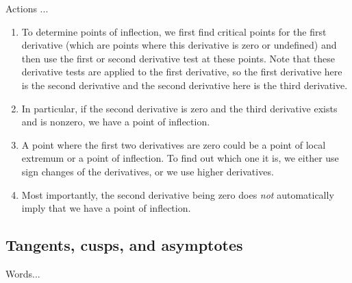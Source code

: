 \documentclass[10pt]{amsart}
\begin{document}
Actions ...

\begin{enumerate}

\item To determine points of inflection, we first find critical points
  for the first derivative (which are points where this derivative is
  zero or undefined) and then use the first or second derivative test
  at these points. Note that these derivative tests are applied to
  the first derivative, so the first derivative here is the second
  derivative and the second derivative here is the third derivative.
\item In particular, if the second derivative is zero and the third
  derivative exists and is nonzero, we have a point of inflection.
\item A point where the first two derivatives are zero could be a
  point of local extremum or a point of inflection. To find out which
  one it is, we either use sign changes of the derivatives, or we use
  higher derivatives.
\item Most importantly, the second derivative being zero does {\em
  not} automatically imply that we have a point of inflection.
\end{enumerate}
\subsection{Tangents, cusps, and asymptotes}

Words...
\end{document}
